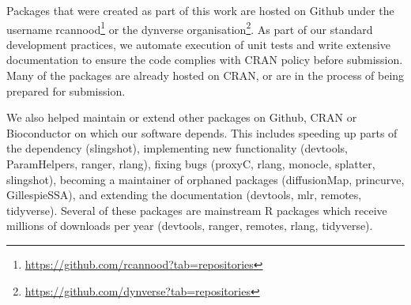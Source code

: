 Packages that were created as part of this work are hosted on Github under the username rcannood\footnote{\url{https://github.com/rcannood?tab=repositories}} or the dynverse organisation\footnote{\url{https://github.com/dynverse?tab=repositories}}. As part of our standard development practices, we automate execution of unit tests and write extensive documentation to ensure the code complies with CRAN policy before submission. Many of the packages are already hosted on CRAN, or are in the process of being prepared for submission.

We also helped maintain or extend other packages on Github, CRAN or Bioconductor on which our software depends. This includes speeding up parts of the dependency (slingshot), implementing new functionality (devtools, ParamHelpers, ranger, rlang), fixing bugs (proxyC, rlang, monocle, splatter, slingshot), becoming a maintainer of orphaned packages (diffusionMap, princurve, GillespieSSA), and extending the documentation (devtools, mlr, remotes, tidyverse). Several of these packages are mainstream R packages which receive millions of downloads per year (devtools, ranger, remotes, rlang, tidyverse).

\newcommand{\cranpkg}[1]{\href{https://cran.r-project.org/package=#1}{#1}}
\newcommand{\biocpkg}[1]{\href{https://bioconductor.org/packages/#1}{#1}}
\newcommand{\biocpkgl}[2]{\href{https://bioconductor.org/packages/#1}{#2}}
\newcommand{\githubpkg}[2]{\href{https://github.com/#1/#2}{#2}}
\newcommand{\notavailable}{}

